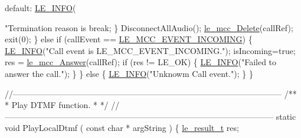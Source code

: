 \begin{DoxyCodeInclude}
{{{{{{{{{{            \textcolor{keywordflow}{default}:
                \hyperlink{le__log_8h_a23e6d206faa64f612045d688cdde5808}{LE\_INFO}(\textcolor{stringliteral}{"Termination reason is %
                \textcolor{keywordflow}{break};
        \}
        DisconnectAllAudio();
        \hyperlink{le__mcc__interface_8h_a1a016e6443df2d3ee99113649f4f34ae}{le\_mcc\_Delete}(callRef);
        exit(0);
    \}
    \textcolor{keywordflow}{else} \textcolor{keywordflow}{if} (callEvent == \hyperlink{le__mcc__interface_8h_aefc4679ffa76d0e04c578572c22f06cfab37936f33d31259ea0c16169ba852bd0}{LE\_MCC\_EVENT\_INCOMING})
    \{
        \hyperlink{le__log_8h_a23e6d206faa64f612045d688cdde5808}{LE\_INFO}(\textcolor{stringliteral}{"Call event is LE\_MCC\_EVENT\_INCOMING."});
        isIncoming=\textcolor{keyword}{true};
        res = \hyperlink{le__mcc__interface_8h_a598349c6ccfa151dbd1d2f2a9c293ca4}{le\_mcc\_Answer}(callRef);
        \textcolor{keywordflow}{if} (res != LE\_OK)
        \{
            \hyperlink{le__log_8h_a23e6d206faa64f612045d688cdde5808}{LE\_INFO}(\textcolor{stringliteral}{"Failed to answer the call."});
        \}
    \}
    \textcolor{keywordflow}{else}
    \{
        \hyperlink{le__log_8h_a23e6d206faa64f612045d688cdde5808}{LE\_INFO}(\textcolor{stringliteral}{"Unknowm Call event."});
    \}
\}

\textcolor{comment}{//--------------------------------------------------------------------------------------------------}\textcolor{comment}{}
\textcolor{comment}{/**}
\textcolor{comment}{ * Play DTMF function.}
\textcolor{comment}{ *}
\textcolor{comment}{ */}
\textcolor{comment}{//--------------------------------------------------------------------------------------------------}
\textcolor{keyword}{static} \textcolor{keywordtype}{void} PlayLocalDtmf
(
    \textcolor{keyword}{const} \textcolor{keywordtype}{char} * argString
)
\{
    \hyperlink{le__basics_8h_a1cca095ed6ebab24b57a636382a6c86c}{le\_result\_t} res;

}}}}}}}}}}}
\end{DoxyCodeInclude}
